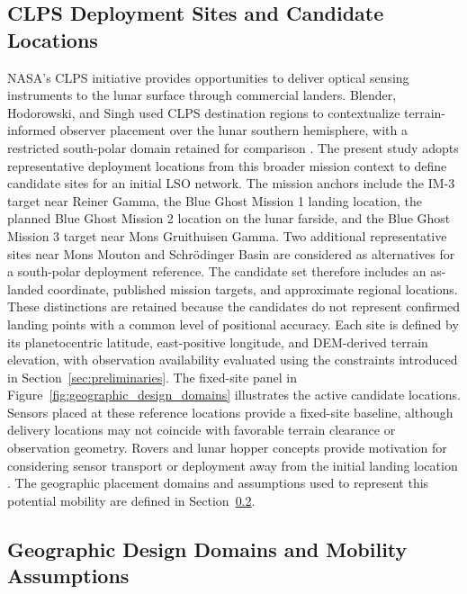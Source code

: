 \subsection{CLPS Deployment Sites and Candidate Locations}
\label{subsec:clps_sites}

NASA's CLPS initiative provides opportunities to deliver optical sensing instruments to the lunar surface through commercial landers. Blender, Hodorowski, and Singh used CLPS destination regions to contextualize terrain-informed observer placement over the lunar southern hemisphere, with a restricted south-polar domain retained for comparison \cite{BlenderHodorowskiSinghAAS}. The present study adopts representative deployment locations from this broader mission context to define candidate sites for an initial LSO network. The mission anchors include the IM-3 target near Reiner Gamma, the Blue Ghost Mission 1 landing location, the planned Blue Ghost Mission 2 location on the lunar farside, and the Blue Ghost Mission 3 target near Mons Gruithuisen Gamma. Two additional representative sites near Mons Mouton and Schr\"odinger Basin are considered as alternatives for a south-polar deployment reference. The candidate set therefore includes an as-landed coordinate, published mission targets, and approximate regional locations. These distinctions are retained because the candidates do not represent confirmed landing points with a common level of positional accuracy. Each site is defined by its planetocentric latitude, east-positive longitude, and DEM-derived terrain elevation, with observation availability evaluated using the constraints introduced in Section~\ref{sec:preliminaries}. The fixed-site panel in Figure~\ref{fig:geographic_design_domains} illustrates the active candidate locations. Sensors placed at these reference locations provide a fixed-site baseline, although delivery locations may not coincide with favorable terrain clearance or observation geometry. Rovers and lunar hopper concepts provide motivation for considering sensor transport or deployment away from the initial landing location \cite{NASAVIPER2025,NASAMicroNova2025}. The geographic placement domains and assumptions used to represent this potential mobility are defined in Section~\ref{subsec:design_domains}.



\subsection{Geographic Design Domains and Mobility Assumptions}
\label{subsec:design_domains}

